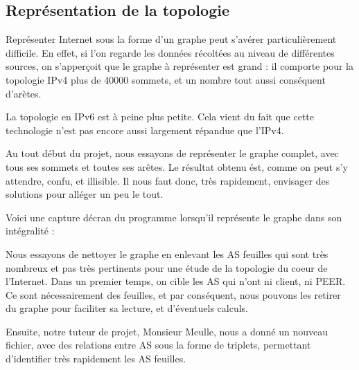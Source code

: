 
% 

\subsection{Repr\'esentation de la topologie}

Repr\'esenter Internet sous la forme d'un graphe peut s'av\'erer particulièrement difficile. En effet, si l'on regarde les donn\'ees r\'ecolt\'ees au niveau de diff\'erentes sources, on s'apperçoit que le graphe \`a repr\'esenter est grand : il comporte pour la topologie IPv4 plus de 40000 sommets, et un nombre tout aussi cons\'equent d'ar\`etes.
\par
La topologie en IPv6 est \`a peine plus petite. Cela vient du fait que cette technologie n'est pas encore aussi largement r\'epandue que l'IPv4.

\par
Au tout d\'ebut du projet, nous essayons de repr\'esenter le graphe complet, avec tous ses sommets et toutes ses ar\^etes. Le r\'esultat obtenu \'est, comme on peut s'y attendre, confu, et illisible. Il nous faut donc, tr\`es rapidement, envisager des solutions pour all\'eger un peu le tout.
\par
Voici une capture d\'ecran du programme lorsqu'il repr\'esente le graphe dans son int\'egralit\'e :

\par
Nous essayons de nettoyer le graphe en enlevant les AS feuilles qui sont tr\`es nombreux et pas tr\`es pertinents pour une \'etude de la topologie du coeur de l'Internet. Dans un premier temps, on cible les AS qui n'ont ni client, ni PEER. Ce sont n\'ecessairement des feuilles, et par cons\'equent, nous pouvons les retirer du graphe pour faciliter sa lecture, et d'\'eventuels calculs.
\par
Ensuite, notre tuteur de projet, Monsieur Meulle, nous a donn\'e un nouveau fichier, avec des relations entre AS sous la forme de triplets, permettant d'identifier tr\`es rapidement les AS feuilles.
%
